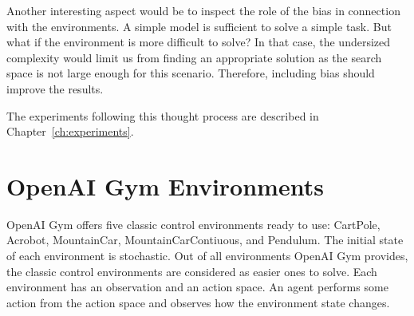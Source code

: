 Another interesting aspect would be to inspect the role of the bias in connection with the environments. A simple model is sufficient to solve a simple task. But what if the environment is more difficult to solve? In that case, the undersized complexity would limit us from finding an appropriate solution as the search space is not large enough for this scenario. Therefore, including bias should improve the results.

The experiments following this thought process are described in Chapter~\ref{ch:experiments}.



\section{OpenAI Gym Environments}
\label{sec:environments}
OpenAI Gym offers five classic control environments ready to use: CartPole, Acrobot, MountainCar, MountainCarContiuous, and Pendulum. The initial state of each environment is stochastic. Out of all environments OpenAI Gym provides, the classic control environments are considered as easier ones to solve. Each environment has an observation and an action space. An agent performs some action from the action space and observes how the environment state changes.

